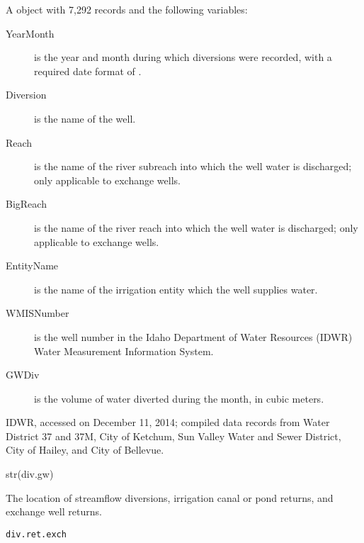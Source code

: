 \documentclass[a4paper]{book}
\begin{document}
\begin{Format}
A  object with 7,292 records and the following variables:
\begin{description}

\item[YearMonth] is the year and month during which diversions were recorded, with a required date format of .
\item[Diversion] is the name of the well.
\item[Reach] is the name of the river subreach into which the well water is discharged; only applicable to exchange wells.
\item[BigReach] is the name of the river reach into which the well water is discharged; only applicable to exchange wells.
\item[EntityName] is the name of the irrigation entity which the well supplies water.
\item[WMISNumber] is the well number in the Idaho Department of Water Resources (IDWR) Water Measurement Information System.
\item[GWDiv] is the volume of water diverted during the month, in cubic meters.

\end{description}

\end{Format}
%
\begin{Source}\relax
IDWR, accessed on December 11, 2014;
compiled data records from Water District 37 and 37M, City of Ketchum, Sun Valley Water and Sewer District, City of Hailey, and City of Bellevue.
\end{Source}
%
\begin{Examples}
\begin{ExampleCode}
str(div.gw)
\end{ExampleCode}
\end{Examples}
%
\begin{Description}\relax
The location of streamflow diversions, irrigation canal or pond returns, and exchange well returns.
\end{Description}
%
\begin{Usage}
\begin{verbatim}
div.ret.exch
\end{verbatim}
\end{Usage}
%
\end{document}
